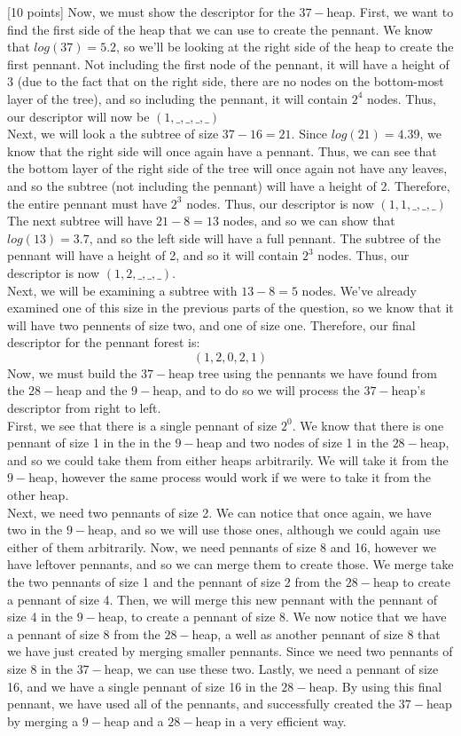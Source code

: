 \documentclass[12pt]{article}
\newcounter{ques}
\newenvironment{question}{\stepcounter{ques}{\noindent\bf Question \arabic{ques}:}}{\vspace{5mm}}
\begin{document}
\begin{question}[10 points]
Now, we must show the descriptor for the $37-$heap.
First, we want to find the first side of the heap that we can use to create the pennant. We know that $log(37)=5.2$, so we'll be looking at the right side of the heap to create the first pennant. Not including the first node of the pennant, it will have a height of 3 (due to the fact that on the right side, there are no nodes on the bottom-most layer of the tree), and so including the pennant, it will contain $2^4$ nodes. Thus, our descriptor will now be $(1,\_,\_,\_,\_)$\\
Next, we will look a the subtree of size $37-16=21$. Since $log(21)=4.39$, we know that the right side will once again have a pennant. Thus, we can see that the bottom layer of the right side of the tree will once again not have any leaves, and so the subtree (not including the pennant) will have a height of 2. Therefore, the entire pennant must have $2^3$ nodes. Thus, our descriptor is now $(1,1,\_,\_,\_)$\\
The next subtree will have $21-8=13$ nodes, and so we can show that $log(13)=3.7$, and so the left side will have a full pennant. The subtree of the pennant will have a height of 2, and so it will contain $2^3$ nodes. Thus, our descriptor is now $(1,2,\_,\_,\_)$.\\
Next, we will be examining a subtree with $13-8=5$ nodes. We've already examined one of this size in the previous parts of the question, so we know that it will have two pennents of size two, and one of size one. Therefore, our final descriptor for the pennant forest is:
$$(1,2,0,2,1)$$
Now, we must build the $37-$heap tree using the pennants we have found from the $28-$heap and the $9-$heap, and to do so we will process the $37-$heap's descriptor from right to left.\\
First, we see that there is a single pennant of size $2^0$. We know that there is one pennant of size 1 in the in the $9-$heap and two nodes of size 1 in the $28-$heap, and so we could take them from either heaps arbitrarily. We will take it from the $9-$heap, however the same process would work if we were to take it from the other heap.\\
Next, we need two pennants of size 2. We can notice that once again, we have two in the $9-$heap, and so we will use those ones, although we could again use either of them arbitrarily. Now, we need pennants of size 8 and 16, however we have leftover pennants, and so we can merge them to create those. We merge take the two pennants of size 1 and the pennant of size 2 from the $28-$heap to create a pennant of size 4. Then, we will merge this new pennant with the pennant of size 4 in the $9-$heap, to create a pennant of size 8. We now notice that we have a pennant of size 8 from the $28-$heap, a well as another pennant of size 8 that we have just created by merging smaller pennants. Since we need two pennants of size 8 in the $37-$heap, we can use these two. Lastly, we need a pennant of size 16, and we have a single pennant of size 16 in the $28-$heap. By using this final pennant, we have used all of the pennants, and successfully created the $37-$heap by merging a $9-$heap and a $28-$heap in a very efficient way.
\end{question}
\end{document}
